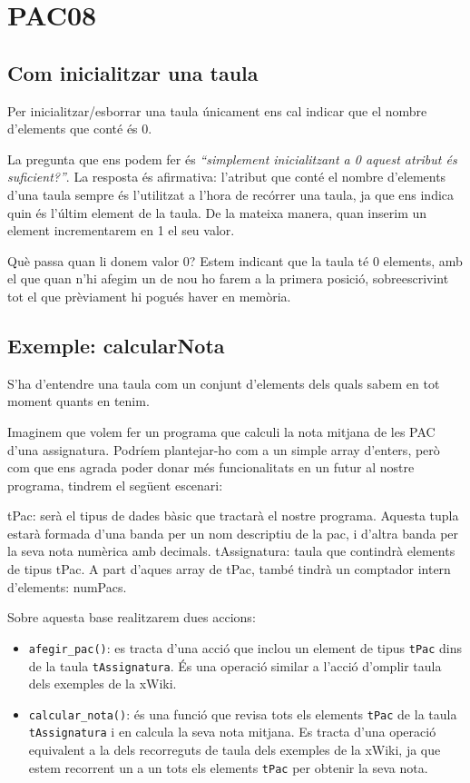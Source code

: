\documentclass[]{book}
\providecommand{\tightlist}{%
  \setlength{\itemsep}{0pt}\setlength{\parskip}{0pt}}
\begin{document}
\hypertarget{pac08}{%
\chapter{PAC08}\label{pac08}}

\hypertarget{com-inicialitzar-una-taula}{%
\section{Com inicialitzar una taula}\label{com-inicialitzar-una-taula}}

Per inicialitzar/esborrar una taula únicament ens cal indicar que el nombre d'elements que conté és 0.

La pregunta que ens podem fer és \emph{``simplement inicialitzant a 0 aquest atribut és suficient?''}. La resposta és afirmativa: l'atribut que conté el nombre d'elements d'una taula sempre és l'utilitzat a l'hora de recórrer una taula, ja que ens indica quin és l'últim element de la taula. De la mateixa manera, quan inserim un element incrementarem en 1 el seu valor.

Què passa quan li donem valor 0? Estem indicant que la taula té 0 elements, amb el que quan n'hi afegim un de nou ho farem a la primera posició, sobreescrivint tot el que prèviament hi pogués haver en memòria.

\hypertarget{exemple-calcularnota}{%
\section{Exemple: calcularNota}\label{exemple-calcularnota}}

S'ha d'entendre una taula com un conjunt d'elements dels quals sabem en tot moment quants en tenim.

Imaginem que volem fer un programa que calculi la nota mitjana de les PAC d'una assignatura. Podríem plantejar-ho com a un simple array d'enters, però com que ens agrada poder donar més funcionalitats en un futur al nostre programa, tindrem el següent escenari:

tPac: serà el tipus de dades bàsic que tractarà el nostre programa. Aquesta tupla estarà formada d'una banda per un nom descriptiu de la pac, i d'altra banda per la seva nota numèrica amb decimals.
tAssignatura: taula que contindrà elements de tipus tPac. A part d'aques array de tPac, també tindrà un comptador intern d'elements: numPacs.

Sobre aquesta base realitzarem dues accions:

\begin{itemize}
\tightlist
\item
  \texttt{afegir\_pac()}: es tracta d'una acció que inclou un element de tipus \texttt{tPac} dins de la taula \texttt{tAssignatura}. És una operació similar a l'acció d'omplir taula dels exemples de la xWiki.
\item
  \texttt{calcular\_nota()}: és una funció que revisa tots els elements \texttt{tPac} de la taula \texttt{tAssignatura} i en calcula la seva nota mitjana. Es tracta d'una operació equivalent a la dels recorreguts de taula dels exemples de la xWiki, ja que estem recorrent un a un tots els elements \texttt{tPac} per obtenir la seva nota.
\end{itemize}
\end{document}
